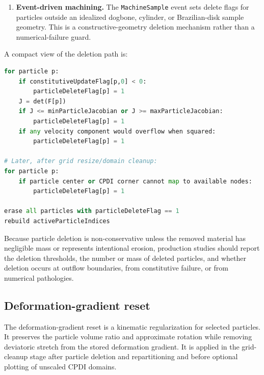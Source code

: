 \begin{enumerate}
  \item \textbf{Event-driven machining.}  The \texttt{MachineSample} event sets delete flags for particles outside an idealized dogbone, cylinder, or Brazilian-disk sample geometry.  This is a constructive-geometry deletion mechanism rather than a numerical-failure guard.
\end{enumerate}

A compact view of the deletion path is:
\begin{lstlisting}[language=Python,caption={Deferred particle deletion in GEOS-MPM.}]
for particle p:
    if constitutiveUpdateFlag[p,0] < 0:
        particleDeleteFlag[p] = 1
    J = det(F[p])
    if J <= minParticleJacobian or J >= maxParticleJacobian:
        particleDeleteFlag[p] = 1
    if any velocity component would overflow when squared:
        particleDeleteFlag[p] = 1

# Later, after grid resize/domain cleanup:
for particle p:
    if particle center or CPDI corner cannot map to available nodes:
        particleDeleteFlag[p] = 1

erase all particles with particleDeleteFlag == 1
rebuild activeParticleIndices
\end{lstlisting}

Because particle deletion is non-conservative unless the removed material has negligible mass or represents intentional erosion, production studies should report the deletion thresholds, the number or mass of deleted particles, and whether deletion occurs at outflow boundaries, from constitutive failure, or from numerical pathologies.

\subsection{Deformation-gradient reset}
\label{subsec:robust-defgrad-reset}

The deformation-gradient reset is a kinematic regularization for selected particles.  It preserves the particle volume ratio and approximate rotation while removing deviatoric stretch from the stored deformation gradient.  It is applied in the grid-cleanup stage after particle deletion and repartitioning and before optional plotting of unscaled CPDI domains.

